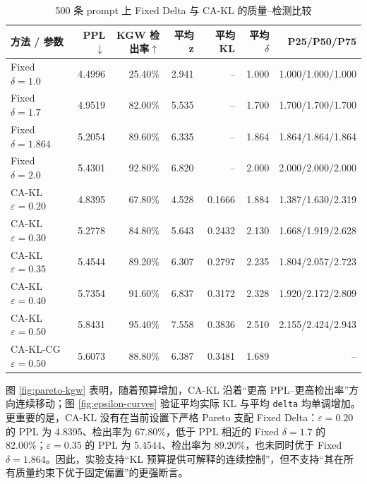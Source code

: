 \documentclass[a4paper,UTF8,zihao=5]{ctexart}
\newcommand{\method}{CA-KL}
\newcommand{\fullmethod}{CA-KL-CG}
\begin{document}
\begin{table}[H]
    \centering
    \caption{500 条 prompt 上 Fixed Delta 与 CA-KL 的质量--检测比较}
    \label{tab:pareto-full}
    \scriptsize
    \setlength{\tabcolsep}{3pt}
    \begin{tabularx}{\textwidth}{p{}rrrrrr}
        \toprule
        方法 / 参数 & PPL$\downarrow$ & KGW 检出率$\uparrow$ & 平均 z & 平均 KL & 平均 $\delta$ & P25/P50/P75 \\
        \midrule
        Fixed $\delta=1.0$ & 4.4996 & 25.40\% & 2.941 & -- & 1.000 & 1.000/1.000/1.000 \\
        Fixed $\delta=1.7$ & 4.9519 & 82.00\% & 5.535 & -- & 1.700 & 1.700/1.700/1.700 \\
        Fixed $\delta=1.864$ & 5.2054 & 89.60\% & 6.335 & -- & 1.864 & 1.864/1.864/1.864 \\
        Fixed $\delta=2.0$ & 5.4301 & 92.80\% & 6.820 & -- & 2.000 & 2.000/2.000/2.000 \\
        \method{} $\varepsilon=0.20$ & 4.8395 & 67.80\% & 4.528 & 0.1666 & 1.884 & 1.387/1.630/2.319 \\
        \method{} $\varepsilon=0.30$ & 5.2778 & 84.80\% & 5.643 & 0.2432 & 2.130 & 1.668/1.919/2.628 \\
        \method{} $\varepsilon=0.35$ & 5.4544 & 89.20\% & 6.307 & 0.2797 & 2.235 & 1.804/2.057/2.723 \\
        \method{} $\varepsilon=0.40$ & 5.7354 & 91.60\% & 6.837 & 0.3172 & 2.328 & 1.920/2.172/2.809 \\
        \method{} $\varepsilon=0.50$ & 5.8431 & 95.40\% & 7.558 & 0.3836 & 2.510 & 2.155/2.424/2.943 \\
        \fullmethod{} $\varepsilon=0.50$ & 5.6073 & 88.80\% & 6.387 & 0.3481 & 1.689 & -- \\
        \bottomrule
    \end{tabularx}
\end{table}

图 \ref{fig:pareto-kgw} 表明，随着预算增加，CA-KL 沿着“更高 PPL--更高检出率”方向连续移动；图 \ref{fig:epsilon-curves} 验证平均实际 KL 与平均 \texttt{delta} 均单调增加。更重要的是，CA-KL 没有在当前设置下严格 Pareto 支配 Fixed Delta：$\varepsilon=0.20$ 的 PPL 为 4.8395、检出率为 67.80\%，低于 PPL 相近的 Fixed $\delta=1.7$ 的 82.00\%；$\varepsilon=0.35$ 的 PPL 为 5.4544、检出率为 89.20\%，也未同时优于 Fixed $\delta=1.864$。因此，实验支持“KL 预算提供可解释的连续控制”，但不支持“其在所有质量约束下优于固定偏置”的更强断言。
\end{document}
